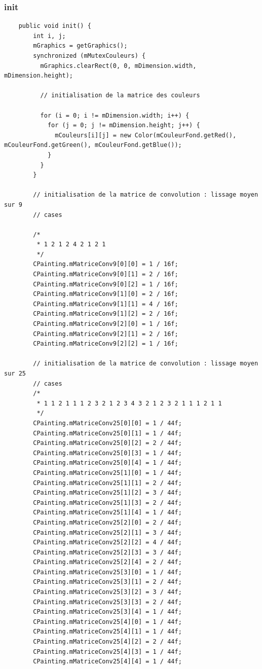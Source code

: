 \documentclass[a4paper,12pt]{article}
\begin{document}
\subsubsection{init}
\begin{lstlisting}
    public void init() {
        int i, j;
        mGraphics = getGraphics();
        synchronized (mMutexCouleurs) {
          mGraphics.clearRect(0, 0, mDimension.width, mDimension.height);
    
          // initialisation de la matrice des couleurs
    
          for (i = 0; i != mDimension.width; i++) {
            for (j = 0; j != mDimension.height; j++) {
              mCouleurs[i][j] = new Color(mCouleurFond.getRed(), mCouleurFond.getGreen(), mCouleurFond.getBlue());
            }
          }
        }
    
        // initialisation de la matrice de convolution : lissage moyen sur 9
        // cases
        
        /*
         * 1 2 1 2 4 2 1 2 1
         */
        CPainting.mMatriceConv9[0][0] = 1 / 16f;
        CPainting.mMatriceConv9[0][1] = 2 / 16f;
        CPainting.mMatriceConv9[0][2] = 1 / 16f;
        CPainting.mMatriceConv9[1][0] = 2 / 16f;
        CPainting.mMatriceConv9[1][1] = 4 / 16f;
        CPainting.mMatriceConv9[1][2] = 2 / 16f;
        CPainting.mMatriceConv9[2][0] = 1 / 16f;
        CPainting.mMatriceConv9[2][1] = 2 / 16f;
        CPainting.mMatriceConv9[2][2] = 1 / 16f;
    
        // initialisation de la matrice de convolution : lissage moyen sur 25
        // cases
        /*
         * 1 1 2 1 1 1 2 3 2 1 2 3 4 3 2 1 2 3 2 1 1 1 2 1 1
         */
        CPainting.mMatriceConv25[0][0] = 1 / 44f;
        CPainting.mMatriceConv25[0][1] = 1 / 44f;
        CPainting.mMatriceConv25[0][2] = 2 / 44f;
        CPainting.mMatriceConv25[0][3] = 1 / 44f;
        CPainting.mMatriceConv25[0][4] = 1 / 44f;
        CPainting.mMatriceConv25[1][0] = 1 / 44f;
        CPainting.mMatriceConv25[1][1] = 2 / 44f;
        CPainting.mMatriceConv25[1][2] = 3 / 44f;
        CPainting.mMatriceConv25[1][3] = 2 / 44f;
        CPainting.mMatriceConv25[1][4] = 1 / 44f;
        CPainting.mMatriceConv25[2][0] = 2 / 44f;
        CPainting.mMatriceConv25[2][1] = 3 / 44f;
        CPainting.mMatriceConv25[2][2] = 4 / 44f;
        CPainting.mMatriceConv25[2][3] = 3 / 44f;
        CPainting.mMatriceConv25[2][4] = 2 / 44f;
        CPainting.mMatriceConv25[3][0] = 1 / 44f;
        CPainting.mMatriceConv25[3][1] = 2 / 44f;
        CPainting.mMatriceConv25[3][2] = 3 / 44f;
        CPainting.mMatriceConv25[3][3] = 2 / 44f;
        CPainting.mMatriceConv25[3][4] = 1 / 44f;
        CPainting.mMatriceConv25[4][0] = 1 / 44f;
        CPainting.mMatriceConv25[4][1] = 1 / 44f;
        CPainting.mMatriceConv25[4][2] = 2 / 44f;
        CPainting.mMatriceConv25[4][3] = 1 / 44f;
        CPainting.mMatriceConv25[4][4] = 1 / 44f;
    

\end{lstlisting}
\end{document}
